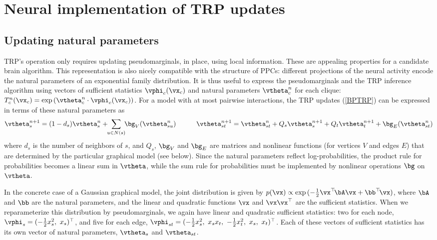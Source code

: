 \documentclass{article}
\begin{document}
\section{Neural implementation of TRP updates}
\label{sec:NeuralTRP}

\subsection{Updating natural parameters}

TRP's operation only requires updating pseudomarginals, in place, using local information. These are appealing properties for a candidate brain algorithm. This representation is also nicely compatible with the structure of PPCs: different projections of the neural activity encode the natural parameters of an exponential family distribution. It is thus useful to express the pseudomarginals and the TRP inference algorithm using vectors of sufficient statistics $\vphi_c(\vx_c)$ and natural parameters $\vtheta_c^n$ for each clique: $T^n_c(\vx_c)=\exp{\left(\vtheta_c^n\cdot\vphi_c(\vx_c)\right)}$. For a model with at most pairwise interactions, the TRP updates (\ref{BPTRP}) can be expressed in terms of these natural parameters as
\begin{equation}
\label{ParamUpdates}
\vtheta_s^{n+1} = (1-d_s)\vtheta_s^n +\!\! \sum_{u\in N(s)} \!\!\bg_V(\vtheta_{su}^n)
\hspace{3em}
\vtheta_{st}^{n+1} = \vtheta_{st}^n  + Q_s \vtheta_s^{n+1} + Q_t \vtheta_t^{n+1} + \bg_E(\vtheta_{st}^n)
\end{equation}
where $d_s$ is the number of neighbors of $s$, and $Q_s$, $\bg_{V}$ and $\bg_{E}$ are matrices and nonlinear functions (for vertices $V$ and edges $E$) that are determined by the particular graphical model (see below). Since the natural parameters reflect log-probabilities, the product rule for probabilities becomes a linear sum in $\vtheta$, while the sum rule for probabilities must be implemented by nonlinear operations $\bg$ on $\vtheta$.

In the concrete case of a Gaussian graphical model, the joint distribution is given by $p(\vx) \propto \exp{ (-\frac{1}{2}\vx^\top \! \bA \vx  + \bb^\top\! \vx )}$, where $\bA$ and $\bb$ are the natural parameters, and the linear and quadratic functions $\vx$ and $\vx\vx^\top$ are the sufficient statistics. When we reparameterize this distribution by pseudomarginals, we again have linear and quadratic sufficient statistics: two for each node, $\vphi_s=(-\frac{1}{2}x_s^2,\ x_s)^\top$, and five for each edge, $\vphi_{st}=(-\frac{1}{2}x_s^2,\ x_sx_t,\ -\frac{1}{2}x_t^2,\ x_s,\ x_t)^\top$. Each of these vectors of sufficient statistics has its own vector of natural parameters, $\vtheta_s$ and $\vtheta_{st}$.
\end{document}
